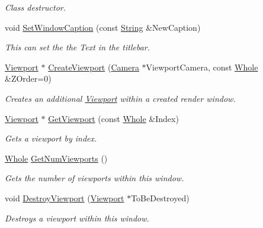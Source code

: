 \begin{DoxyCompactItemize}
\begin{DoxyCompactList}\small\item\em Class destructor. \item\end{DoxyCompactList}\item 
void \hyperlink{classphys_1_1GameWindow_a95a0f35d2546c36d5698e835902f010c}{SetWindowCaption} (const \hyperlink{namespacephys_aa03900411993de7fbfec4789bc1d392e}{String} \&NewCaption)
\begin{DoxyCompactList}\small\item\em This can set the the Text in the titlebar. \item\end{DoxyCompactList}\item 
\hyperlink{classphys_1_1Viewport}{Viewport} $\ast$ \hyperlink{classphys_1_1GameWindow_a85802f1c30d43bb2992f95ac58683961}{CreateViewport} (\hyperlink{classphys_1_1Camera}{Camera} $\ast$ViewportCamera, const \hyperlink{namespacephys_a460f6bc24c8dd347b05e0366ae34f34a}{Whole} \&ZOrder=0)
\begin{DoxyCompactList}\small\item\em Creates an additional \hyperlink{classphys_1_1Viewport}{Viewport} within a created render window. \item\end{DoxyCompactList}\item 
\hyperlink{classphys_1_1Viewport}{Viewport} $\ast$ \hyperlink{classphys_1_1GameWindow_a048bdd313420da1902bdc5226d14ae47}{GetViewport} (const \hyperlink{namespacephys_a460f6bc24c8dd347b05e0366ae34f34a}{Whole} \&Index)
\begin{DoxyCompactList}\small\item\em Gets a viewport by index. \item\end{DoxyCompactList}\item 
\hyperlink{namespacephys_a460f6bc24c8dd347b05e0366ae34f34a}{Whole} \hyperlink{classphys_1_1GameWindow_a4b97aaa248a2382b78520b1623dc2978}{GetNumViewports} ()
\begin{DoxyCompactList}\small\item\em Gets the number of viewports within this window. \item\end{DoxyCompactList}\item 
void \hyperlink{classphys_1_1GameWindow_ac9c359317e9a1612fbc5fef886de4040}{DestroyViewport} (\hyperlink{classphys_1_1Viewport}{Viewport} $\ast$ToBeDestroyed)
\begin{DoxyCompactList}\small\item\em Destroys a viewport within this window. \item\end{DoxyCompactList}\item 

\end{DoxyCompactItemize}
